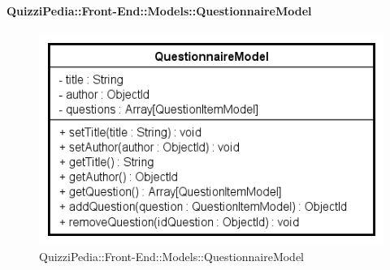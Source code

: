 \paragraph{QuizziPedia::Front-End::Models::QuestionnaireModel}
		
		\label{QuizziPedia::Front-End::Models::QuestionnaireModel}
		
		\begin{figure}[ht]
			\centering
			\includegraphics[scale=0.6,keepaspectratio]{UML/Classi/Front-End/QuizziPedia_Front-end_Models_QuestionnaireModel.png}
			\caption{QuizziPedia::Front-End::Models::QuestionnaireModel}
		\end{figure} \FloatBarrier
		
